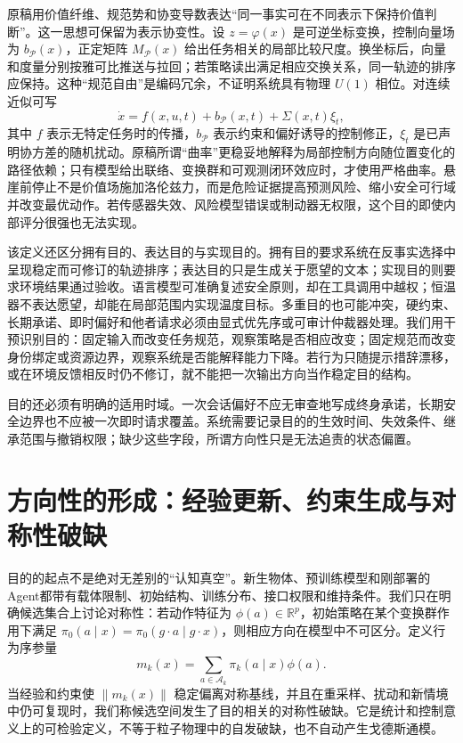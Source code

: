 原稿用价值纤维、规范势和协变导数表达“同一事实可在不同表示下保持价值判断”。这一思想可保留为表示协变性。设 $z=\varphi(x)$ 是可逆坐标变换，控制向量场为 $b_{\mathcal P}(x)$，正定矩阵 $M_{\mathcal P}(x)$ 给出任务相关的局部比较尺度。换坐标后，向量和度量分别按雅可比推送与拉回；若策略读出满足相应交换关系，同一轨迹的排序应保持。这种“规范自由”是编码冗余，不证明系统具有物理 $U(1)$ 相位。对连续近似可写
\[
\dot{x}=f(x,u,t)+b_{\mathcal P}(x,t)+\Sigma(x,t)\xi_t,
\]
其中 $f$ 表示无特定任务时的传播，$b_{\mathcal P}$ 表示约束和偏好诱导的控制修正，$\xi_t$ 是已声明协方差的随机扰动。原稿所谓“曲率”更稳妥地解释为局部控制方向随位置变化的路径依赖；只有模型给出联络、变换群和可观测闭环效应时，才使用严格曲率。悬崖前停止不是价值场施加洛伦兹力，而是危险证据提高预测风险、缩小安全可行域并改变最优动作。若传感器失效、风险模型错误或制动器无权限，这个目的即使内部评分很强也无法实现。

该定义还区分拥有目的、表达目的与实现目的。拥有目的要求系统在反事实选择中呈现稳定而可修订的轨迹排序；表达目的只是生成关于愿望的文本；实现目的则要求环境结果通过验收。语言模型可准确复述安全原则，却在工具调用中越权；恒温器不表达愿望，却能在局部范围内实现温度目标。多重目的也可能冲突，硬约束、长期承诺、即时偏好和他者请求必须由显式优先序或可审计仲裁器处理。我们用干预识别目的：固定输入而改变任务规范，观察策略是否相应改变；固定规范而改变身份绑定或资源边界，观察系统是否能解释能力下降。若行为只随提示措辞漂移，或在环境反馈相反时仍不修订，就不能把一次输出方向当作稳定目的结构。

目的还必须有明确的适用时域。一次会话偏好不应无审查地写成终身承诺，长期安全边界也不应被一次即时请求覆盖。系统需要记录目的的生效时间、失效条件、继承范围与撤销权限；缺少这些字段，所谓方向性只是无法追责的状态偏置。

\section{方向性的形成：经验更新、约束生成与对称性破缺}
\label{sec:section_7853}

目的的起点不是绝对无差别的“认知真空”。新生物体、预训练模型和刚部署的Agent都带有载体限制、初始结构、训练分布、接口权限和维持条件。我们只在明确候选集合上讨论对称性：若动作特征为 $\phi(a)\in\mathbb{R}^{p}$，初始策略在某个变换群作用下满足 $\pi_0(a\mid x)=\pi_0(g\cdot a\mid g\cdot x)$，则相应方向在模型中不可区分。定义行为序参量
\[
m_k(x)=\sum_{a\in\mathcal A_k}\pi_k(a\mid x)\phi(a).
\]
当经验和约束使 $\|m_k(x)\|$ 稳定偏离对称基线，并且在重采样、扰动和新情境中仍可复现时，我们称候选空间发生了目的相关的对称性破缺。它是统计和控制意义上的可检验定义，不等于粒子物理中的自发破缺，也不自动产生戈德斯通模。

